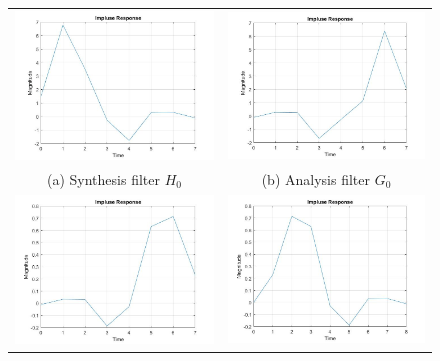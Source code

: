 \begin{figure}[htpb]
\centering
\begin{tabular}{cc}
  \includegraphics[width=75mm]{H0_Response.jpg} & \includegraphics[width=75mm]{G0_Response.jpg} \\
(a) Synthesis filter $H_0$ & (b) Analysis filter $G_0$ \\[8pt]
 \includegraphics[width=75mm]{H1_Response.jpg} & \includegraphics[width=75mm]{G1_Response.jpg} \\

\end{tabular}
\end{figure}
